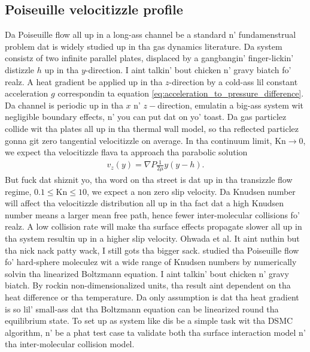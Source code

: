 \subsection{Poiseuille velocitizzle profile}
\label{sec:dsmc_validation_poiseuille}
Da Poiseuille flow all up in a long-ass channel be a standard n' fundamenstrual problem dat is widely studied up in tha gas dynamics literature. Da system consistz of two infinite parallel plates, displaced by a gangbangin' finger-lickin' distizzle $h$ up in tha $y$-direction. I aint talkin' bout chicken n' gravy biatch fo' realz. A heat gradient be applied up in tha $z$-direction by a cold-ass lil constant acceleration $g$ correspondin ta equation \ref{eq:acceleration_to_pressure_difference}. Da channel is periodic up in tha $x$ n' $z-$direction, emulatin a big-ass system wit negligible boundary effects, n' you can put dat on yo' toast. Da gas particlez collide wit tha plates all up in tha thermal wall model, so tha reflected particlez gonna git zero tangential velocitizzle on average. In tha continuum limit, $\text{Kn}\rightarrow 0$, we expect tha velocitizzle flava ta approach tha parabolic solution \cite{batchelor2000introduction}
\begin{align}
	v_z(y) = \nabla P\frac{1}{2\mu}y(y-h).
\end{align}
But fuck dat shiznit yo, tha word on tha street is dat up in tha transizzle flow regime, $0.1 \leq \text{Kn} \leq 10$, we expect a non zero slip velocity\cite{morris1992slip}. Da Knudsen number will affect tha velocitizzle distribution all up in tha fact dat a high Knudsen number means a larger mean free path, hence fewer inter-molecular collisions fo' realz. A low collision rate will make tha surface effects propagate slower all up in tha system resultin up in a higher slip velocity. Ohwada et al. It aint nuthin but tha nick nack patty wack, I still gots tha bigger sack. \cite{ohwada1989numerical} studied tha Poiseuille flow fo' hard-sphere moleculez wit a wide range of Knudsen numbers by numerically solvin tha linearized Boltzmann equation. I aint talkin' bout chicken n' gravy biatch. By rockin non-dimensionalized units, tha result aint dependent on tha heat difference or tha temperature. Da only assumption is dat tha heat gradient is so lil' small-ass dat tha Boltzmann equation can be linearized round tha equilibrium state. To set up as system like dis be a simple task wit tha DSMC algorithm, n' be a phat test case ta validate both tha surface interaction model n' tha inter-molecular collision model.

